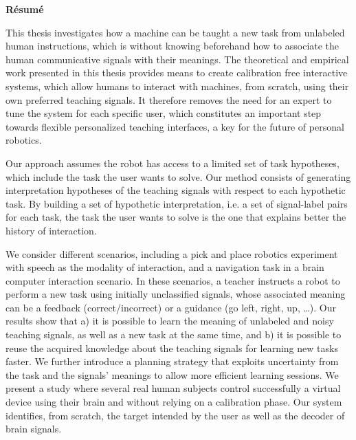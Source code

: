 
\begin{vcenterpage}

\begin{center}
{\LARGE\textbf{Résumé}} 
\end{center}


This thesis investigates how a machine can be taught a new task from unlabeled human instructions, which is without knowing beforehand how to associate the human communicative signals with their meanings. The theoretical and empirical work presented in this thesis provides means to create calibration free interactive systems, which allow humans to interact with machines, from scratch, using their own preferred teaching signals. It therefore removes the need for an expert to tune the system for each specific user, which constitutes an important step towards flexible personalized teaching interfaces, a key for the future of personal robotics.

Our approach assumes the robot has access to a limited set of task hypotheses, which include the task the user wants to solve. Our method consists of generating interpretation hypotheses of the teaching signals with respect to each hypothetic task. By building a set of hypothetic interpretation, i.e. a set of signal-label pairs for each task, the task the user wants to solve is the one that explains better the history of interaction.

We consider different scenarios, including a pick and place robotics experiment with speech as the modality of interaction, and a navigation task in a brain computer interaction scenario. In these scenarios, a teacher instructs a robot to perform a new task using initially unclassified signals, whose associated meaning can be a feedback (correct/incorrect) or a guidance (go left, right, up, \ldots). Our results show that a) it is possible to learn the meaning of unlabeled and noisy teaching signals, as well as a new task at the same time, and b) it is possible to reuse the acquired knowledge about the teaching signals for learning new tasks faster. We further introduce a planning strategy that exploits uncertainty from the task and the signals' meanings to allow more efficient learning sessions. We present a study where several real human subjects control successfully a virtual device using their brain and without relying on a calibration phase. Our system identifies, from scratch, the target intended by the user as well as the decoder of brain signals.


\end{vcenterpage}
